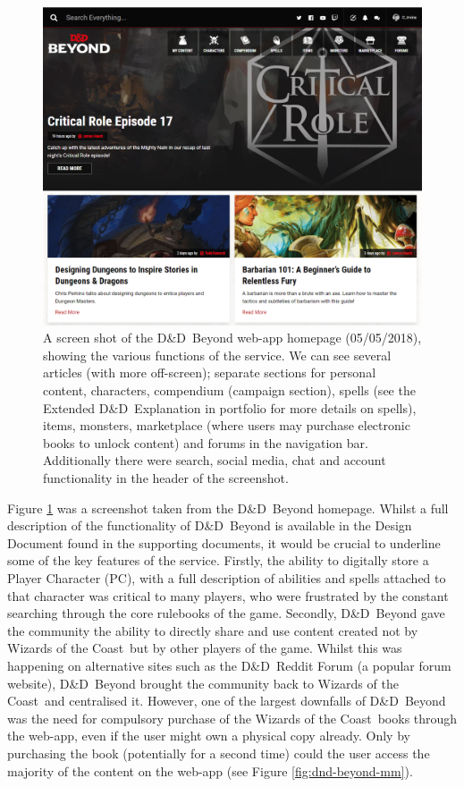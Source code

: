 \documentclass[final]{cmpreport}
\newcommand{\WotC}{Wizards of the Coast}
\newcommand{\dnd}{D\&D}
\begin{document}
			\begin{figure}[H]
				\centering
				\includegraphics[width=\linewidth]{dnd-beyond.png}
				\caption[\dnd \ Beyond homepage screenshot]{A screen shot of the \dnd \ Beyond web-app homepage (05/05/2018), showing the various functions of the service. We can see several articles (with more off-screen); separate sections for personal content, characters, compendium (campaign section), spells (see the Extended \dnd \ Explanation in portfolio for more details on spells), items, monsters, marketplace (where users may purchase electronic books to unlock content) and forums in the navigation bar. Additionally there were search, social media, chat and account functionality in the header of the screenshot.} \label{fig:dnd-beyond}
			\end{figure}
		
			Figure \ref{fig:dnd-beyond} was a screenshot taken from the \dnd \ Beyond homepage. Whilst a full description of the functionality of \dnd \ Beyond is available in the Design Document found in the supporting documents, it would be crucial to underline some of the key features of the service. Firstly, the ability to digitally store a Player Character (PC), with a full description of abilities and spells attached to that character was critical to many players, who were frustrated by the constant searching through the core rulebooks of the game. Secondly, \dnd \ Beyond gave the community the ability to directly share and use content created not by \WotC \ but by other players of the game. Whilst this was happening on alternative sites such as the \dnd \ Reddit Forum \citep{reddit-dnd} (a popular forum website), \dnd \ Beyond brought the community back to \WotC \ and centralised it. However, one of the largest downfalls of \dnd \ Beyond was the need for compulsory purchase of the \WotC \ books through the web-app, even if the user might own a physical copy already. Only by purchasing the book (potentially for a second time) could the user access the majority of the content on the web-app (see Figure \ref{fig:dnd-beyond-mm}).
			
\end{document}
